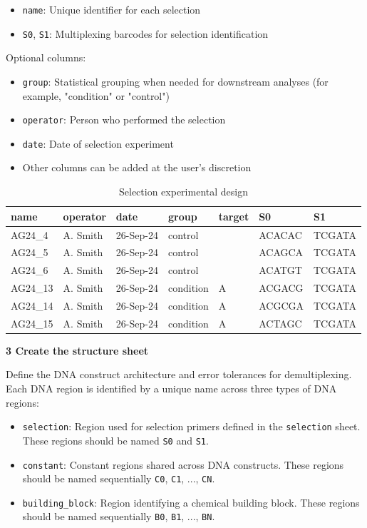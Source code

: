 \documentclass[pdflatex,sn-nature]{sn-jnl}
\newcommand{\protocolstep}[2]{\par\medskip\noindent\textbf{#1 \textbar{} #2}\par}
\begin{document}
\begin{itemize}
  \item \texttt{name}: Unique identifier for each selection
  \item \texttt{S0}, \texttt{S1}: Multiplexing barcodes for selection identification
\end{itemize}
Optional columns:

\begin{itemize}
  \item \texttt{group}: Statistical grouping when needed for downstream analyses (for example, "condition" or "control")
  \item \texttt{operator}: Person who performed the selection
  \item \texttt{date}: Date of selection experiment
  \item Other columns can be added at the user's discretion
\end{itemize}

\begin{table}[htbp]
\centering
\caption{Selection experimental design}
\label{tab:table4}
\begin{tabular}{lllllll}
\toprule
name & operator & date & group & target & S0 & S1 \\
\midrule
AG24\_4 & A. Smith & 26-Sep-24 & control &  & ACACAC & TCGATA \\
AG24\_5 & A. Smith & 26-Sep-24 & control &  & ACAGCA & TCGATA \\
AG24\_6 & A. Smith & 26-Sep-24 & control &  & ACATGT & TCGATA \\
AG24\_13 & A. Smith & 26-Sep-24 & condition & A & ACGACG & TCGATA \\
AG24\_14 & A. Smith & 26-Sep-24 & condition & A & ACGCGA & TCGATA \\
AG24\_15 & A. Smith & 26-Sep-24 & condition & A & ACTAGC & TCGATA \\
\bottomrule
\end{tabular}
\end{table}

\protocolstep{3}{Create the structure sheet}

Define the DNA construct architecture and error tolerances for demultiplexing. Each DNA region is identified by a unique name across three types of DNA regions:

\begin{itemize}
  \item \texttt{selection}: Region used for selection primers defined in the \texttt{selection} sheet. These regions should be named \texttt{S0} and \texttt{S1}.
  \item \texttt{constant}: Constant regions shared across DNA constructs. These regions should be named sequentially \texttt{C0}, \texttt{C1}, ..., \texttt{CN}.
  \item \texttt{building\_block}: Region identifying a chemical building block. These regions should be named sequentially \texttt{B0}, \texttt{B1}, ..., \texttt{BN}.
\end{itemize}
\end{document}
